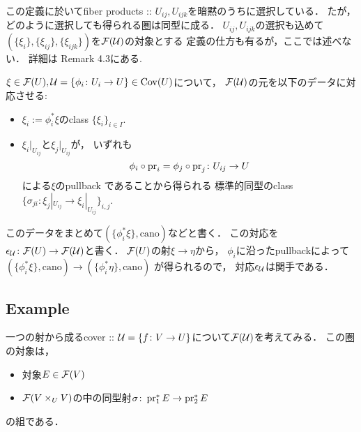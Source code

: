 \documentclass[a4paper]{jsarticle}
\begin{document}
\begin{Remark}
    この定義に於いてfiber products :: $U_{ij}, U_{ijk}$を暗黙のうちに選択している．
    たが，どのように選択しても得られる圏は同型に成る．
    $U_{ij}, U_{ijk}$の選択も込めて
    $(\{\xi_i\}, \{\xi_{ij}\}, \{\xi_{ijk}\})$を$\mathcal{F}(\mathcal{U})$の対象とする
    定義の仕方も有るが，ここでは述べない．
    詳細は\cite{NoteGroTop} Remark 4.3にある.
\end{Remark}

\begin{Def} \label{def:epsilon}
    $\xi \in \mathcal{F}(U), \mathcal{U}=\{\phi_i \colon U_i \to U\} \in \operatorname{Cov}(U)$について，
    $\mathcal{F}(\mathcal{U})$の元を以下のデータに対応させる:
    \begin{itemize}
        \item $\xi_i:=\phi_i^*\xi$のclass $\{\xi_i\}_{i \in I}$.
        \item
            $\xi_i|_{U_{ij}}$と$\xi_j|_{U_{ij}}$が，
            いずれも
            \[ \phi_i \circ \operatorname{pr}_i=\phi_j \circ \operatorname{pr}_j \colon U_{ij} \to U \]による$\xi$のpullback
            であることから得られる
            標準的同型のclass $\{ \sigma_{ji} \colon \xi_j|_{U_{ij}} \to \xi_i|_{U_{ij}} \}_{i,j}$.
    \end{itemize}
    このデータをまとめて$(\{\phi_i^*\xi\}, \mathrm{cano})$などと書く．
    この対応を$\epsilon_{\mathcal{U}} \colon \mathcal{F}(U) \to \mathcal{F}(\mathcal{U})$と書く．
    $\mathcal{F}(U)$の射$\xi \to \eta$から，
    $\phi_i$に沿ったpullbackによって$(\{\phi_i^*\xi\}, \mathrm{cano}) \to (\{\phi_i^*\eta\}, \mathrm{cano})$
    が得られるので，
    対応$\epsilon_{\mathcal{U}}$は関手である．
\end{Def}

\subsection{Example}
\begin{Example}
    一つの射から成るcover :: $\mathcal{U}=\{f \colon V \to U\}$について$\mathcal{F}(\mathcal{U})$を考えてみる．
    この圏の対象は，
    \begin{itemize}
        \item 対象$E \in \mathcal{F}(V)$
        \item $\mathcal{F}(V \times_U V)$の中の同型射$\sigma \colon \operatorname{pr}_1^*E \to \operatorname{pr}_2^*E$
    \end{itemize}
    の組である．
\end{Example}

\begin{Example}
        
\end{Example}
\end{document}
